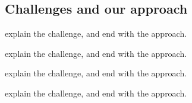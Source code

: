 





\subsection{Challenges and our approach}

 explain the challenge, and end with the approach.


 explain the challenge, and end with the approach.


 explain the challenge, and end with the approach.


 explain the challenge, and end with the approach.

\fi